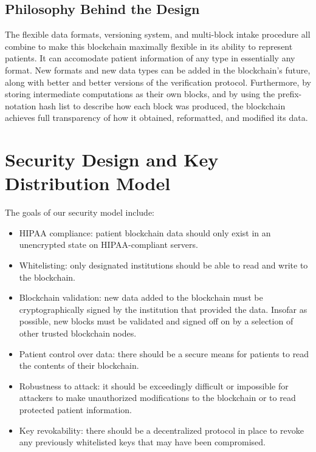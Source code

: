 \documentclass[12pt]{article}
\begin{document}
\subsection{Philosophy Behind the Design}
The flexible data formats, versioning system, and multi-block intake procedure all combine to make this blockchain maximally flexible in its ability to represent patients. It can accomodate patient information of any type in essentially any format. New formats and new data types can be added in the blockchain's future, along with better and better versions of the verification protocol. Furthermore, by storing intermediate computations as their own blocks, and by using the prefix-notation hash list to describe how each block was produced, the blockchain achieves full transparency of how it obtained, reformatted, and modified its data.



\section{Security Design and Key Distribution Model}

The goals of our security model include:
\begin{itemize}
\item HIPAA compliance: patient blockchain data should only exist in an unencrypted state on HIPAA-compliant servers.

\item Whitelisting: only designated institutions should be able to read and write to the blockchain.

\item Blockchain validation: new data added to the blockchain must be cryptographically signed by the institution that provided the data. Insofar as possible, new blocks must be validated and signed off on by a selection of other trusted blockchain nodes.

\item Patient control over data: there should be a secure means for patients to read the contents of their blockchain.

\item Robustness to attack: it should be exceedingly difficult or impossible for attackers to make unauthorized modifications to the blockchain or to read protected patient information.

\item Key revokability: there should be a decentralized protocol in place to revoke any previously whitelisted keys that may have been compromised.
\end{itemize}
\end{document}
